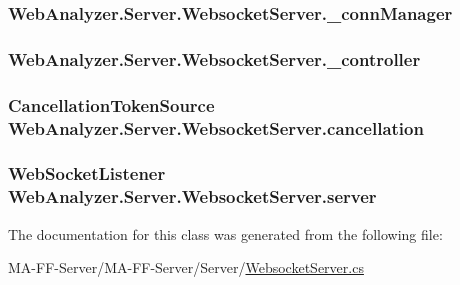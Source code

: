 \subsubsection[{\+\_\+conn\+Manager}]{ Web\+Analyzer.\+Server.\+Websocket\+Server.\+\_\+conn\+Manager\hspace{0.3cm}{\ttfamily [private]}}\label{class_web_analyzer_1_1_server_1_1_websocket_server_ac98422e37a10a6c4fd3900a09b003b5e}
\hypertarget{class_web_analyzer_1_1_server_1_1_websocket_server_ae9083f25b4a1b713998b19eb68e35d6e}{}
\subsubsection[{\+\_\+controller}]{ Web\+Analyzer.\+Server.\+Websocket\+Server.\+\_\+controller\hspace{0.3cm}{\ttfamily [private]}}\label{class_web_analyzer_1_1_server_1_1_websocket_server_ae9083f25b4a1b713998b19eb68e35d6e}
\hypertarget{class_web_analyzer_1_1_server_1_1_websocket_server_ac6ff75e9f3bc2200953d755b029e5344}{}
\subsubsection[{cancellation}]{\setlength{\rightskip}{0pt plus 5cm}Cancellation\+Token\+Source Web\+Analyzer.\+Server.\+Websocket\+Server.\+cancellation\hspace{0.3cm}{\ttfamily [private]}}\label{class_web_analyzer_1_1_server_1_1_websocket_server_ac6ff75e9f3bc2200953d755b029e5344}
\hypertarget{class_web_analyzer_1_1_server_1_1_websocket_server_abc42c992699d787cfdcb33f9e51140b4}{}
\subsubsection[{server}]{\setlength{\rightskip}{0pt plus 5cm}Web\+Socket\+Listener Web\+Analyzer.\+Server.\+Websocket\+Server.\+server\hspace{0.3cm}{\ttfamily [private]}}\label{class_web_analyzer_1_1_server_1_1_websocket_server_abc42c992699d787cfdcb33f9e51140b4}


The documentation for this class was generated from the following file\+:\begin{DoxyCompactItemize}
\item 
M\+A-\/\+F\+F-\/\+Server/\+M\+A-\/\+F\+F-\/\+Server/\+Server/\hyperlink{_websocket_server_8cs}{Websocket\+Server.\+cs}\end{DoxyCompactItemize}
